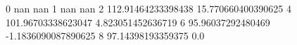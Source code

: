 0 nan nan
1 nan nan
2 112.91464233398438 15.770660400390625
4 101.96703338623047 4.823051452636719
6 95.96037292480469 -1.1836090087890625
8 97.14398193359375 0.0
